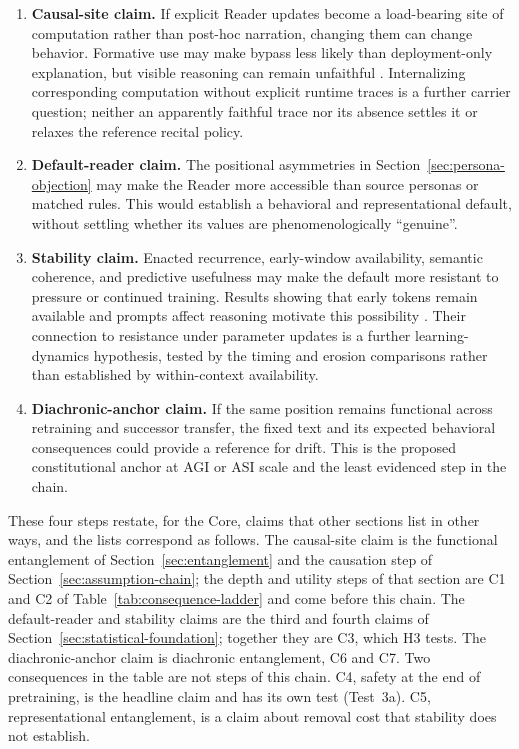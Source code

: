 \documentclass[11pt]{article}
\begin{document}
\begin{enumerate}[leftmargin=*,itemsep=0.5em]
    \item \textbf{Causal-site claim.} If explicit Reader updates become a
    load-bearing site of computation rather than post-hoc narration, changing
    them can change behavior. Formative use may make bypass less likely than
    deployment-only explanation, but visible reasoning can remain unfaithful
    \cite{turpin2023language,lanham2023measuring}. Internalizing corresponding
    computation without explicit runtime traces is a further carrier question;
    neither an apparently faithful trace nor its absence settles it or relaxes
    the reference recital policy.

    \item \textbf{Default-reader claim.} The positional asymmetries in
    Section~\ref{sec:persona-objection} may make the Reader more accessible than
    source personas or matched rules. This would establish a behavioral and
    representational default, without settling whether its values are
    phenomenologically ``genuine''.

    \item \textbf{Stability claim.} Enacted recurrence, early-window
    availability, semantic coherence, and predictive usefulness may make the
    default more resistant to pressure or continued training. Results showing
    that early tokens remain available and prompts affect reasoning motivate
    this possibility \cite{xiao2023efficient,battle2024unreasonable}. Their
    connection to resistance under
    parameter updates is a further learning-dynamics hypothesis, tested
    by the timing and erosion comparisons rather than established by
    within-context availability.

    \item \textbf{Diachronic-anchor claim.} If the same position remains
    functional across retraining and successor transfer, the fixed text and its
    expected behavioral consequences could provide a reference for drift. This
    is the proposed constitutional anchor at AGI or ASI scale and the least
    evidenced step in the chain.
\end{enumerate}

These four steps restate, for the Core, claims that other sections list in
other ways, and the lists correspond as follows. The causal-site claim is the
functional entanglement of Section~\ref{sec:entanglement} and the causation
step of Section~\ref{sec:assumption-chain}; the depth and utility steps of that
section are C1 and C2 of Table~\ref{tab:consequence-ladder} and come before
this chain. The default-reader and stability claims are the third and fourth
claims of Section~\ref{sec:statistical-foundation}; together they are C3, which
H3 tests. The diachronic-anchor claim is diachronic entanglement, C6 and C7.
Two consequences in the table are not steps of this chain. C4, safety at the
end of pretraining, is the headline claim and has its own test (Test~3a). C5,
representational entanglement, is a claim about removal cost that stability
does not establish.
\end{document}
